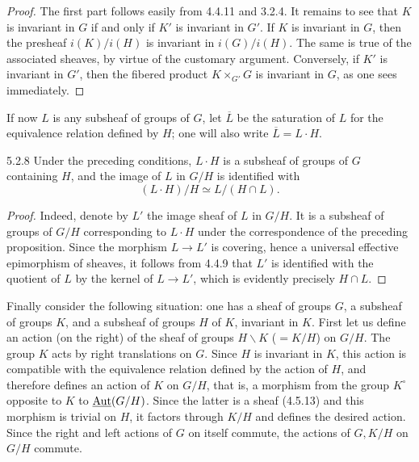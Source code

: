 \begin{proof}
The first part follows easily from 4.4.11 and 3.2.4.
It remains to see that \(K\) is invariant in \(G\)
if and only if \(K'\) is invariant in \(G'\).
If \(K\) is invariant in \(G\), then the presheaf
\(i(K)/i(H)\) is invariant in \(i(G)/i(H)\).
The same is true of the associated sheaves, by
virtue of the customary argument.
Conversely, if \(K'\) is invariant in \(G'\), then
the fibered product \(K\times_{G'}G\) is invariant
in \(G\), as one sees immediately.
\end{proof}
If now \(L\) is any subsheaf of groups of \(G\),
let \(\overline L\) be the saturation of \(L\) for
the equivalence relation defined by \(H\);
one will also write \(\overline L=L\cdot H\).
\begin{proposition}{5.2.8}\label{IV.5.2.8}
Under the preceding conditions, \(L\cdot H\) is a
subsheaf of groups of \(G\) containing \(H\), and
the image of \(L\) in \(G/H\) is identified with
\[
(L\cdot H)/H\simeq L/(H\cap L).
\]
\end{proposition}
\begin{proof}
Indeed, denote by \(L'\) the image sheaf of \(L\)
in \(G/H\). It is a subsheaf of groups of \(G/H\)
corresponding to \(L\cdot H\) under the correspondence
of the preceding proposition.
Since the morphism \(L\to L'\) is covering, hence
a universal effective epimorphism of sheaves,
it follows from 4.4.9 that \(L'\) is identified
with the quotient of \(L\) by the kernel of
\(L\to L'\), which is evidently precisely \(H\cap L\).
\end{proof}

Finally consider the following situation:
one has a sheaf of groups \(G\), a subsheaf of
groups \(K\), and a subsheaf of groups \(H\) of
\(K\), invariant in \(K\).
First let us define an action (on the right) of
the sheaf of groups \(H\backslash K\) (\(=K/H\))
on \(G/H\). The group \(K\) acts by right translations
on \(G\). Since \(H\) is invariant in \(K\), this
action is compatible with the equivalence relation
defined by the action of \(H\), and therefore defines
an action of \(K\) on \(G/H\), that is, a morphism
from the group \(K^\circ\) opposite to \(K\)
to \(\underline{\operatorname{Aut}}(G/H)\).
Since the latter is a sheaf (4.5.13) and this
morphism is trivial on \(H\), it factors through
\(K/H\) and defines the desired action.
Since the right and left actions of \(G\) on
itself commute, the actions of \(G,K/H\) on
\(G/H\) commute.

